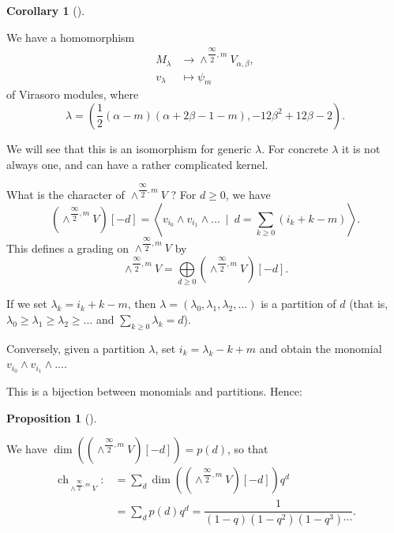 \documentclass
[numbers=enddot,12pt,final,onecolumn,german,notitlepage]{scrartcl}%
\theoremstyle{definition}
\newtheorem{prop}[theo]{Proposition}
\newenvironment{proposition}[1][]
{\begin{prop}[#1]\begin{leftbar}}
{\end{leftbar}\end{prop}}
\newtheorem{coro}[theo]{Corollary}
\newenvironment{corollary}[1][]
{\begin{coro}[#1]\begin{leftbar}}
{\end{leftbar}\end{coro}}
\begin{document}
\begin{corollary}
We have a homomorphism%
\begin{align*}
M_{\lambda}  &  \rightarrow\wedge^{\dfrac{\infty}{2},m}V_{\alpha,\beta},\\
v_{\lambda}  &  \mapsto\psi_{m}%
\end{align*}
of Virasoro modules, where%
\[
\lambda=\left(  \dfrac{1}{2}\left(  \alpha-m\right)  \left(  \alpha
+2\beta-1-m\right)  ,-12\beta^{2}+12\beta-2\right)  .
\]

\end{corollary}

We will see that this is an isomorphism for generic $\lambda$. For concrete
$\lambda$ it is not always one, and can have a rather complicated kernel.

What is the character of $\wedge^{\dfrac{\infty}{2},m}V$ ? For $d\geq0$, we
have%
\[
\left(  \wedge^{\dfrac{\infty}{2},m}V\right)  \left[  -d\right]  =\left\langle
v_{i_{0}}\wedge v_{i_{1}}\wedge...\ \mid\ d=\sum\limits_{k\geq0}\left(
i_{k}+k-m\right)  \right\rangle .
\]
This defines a grading on $\wedge^{\dfrac{\infty}{2},m}V$ by%
\[
\wedge^{\dfrac{\infty}{2},m}V=\bigoplus\limits_{d\geq0}\left(  \wedge
^{\dfrac{\infty}{2},m}V\right)  \left[  -d\right]  .
\]


If we set $\lambda_{k}=i_{k}+k-m$, then $\lambda=\left(  \lambda_{0}%
,\lambda_{1},\lambda_{2},...\right)  $ is a partition of $d$ (that is,
$\lambda_{0}\geq\lambda_{1}\geq\lambda_{2}\geq...$ and $\sum\limits_{k\geq
0}\lambda_{k}=d$).

Conversely, given a partition $\lambda$, set $i_{k}=\lambda_{k}-k+m$ and
obtain the monomial $v_{i_{0}}\wedge v_{i_{1}}\wedge...$.

This is a bijection between monomials and partitions. Hence:

\begin{proposition}
We have $\dim\left(  \left(  \wedge^{\dfrac{\infty}{2},m}V\right)  \left[
-d\right]  \right)  =p\left(  d\right)  $, so that%
\begin{align*}
\operatorname*{ch}\nolimits_{\wedge^{\dfrac{\infty}{2},m}V}:  &  =\sum_{d}%
\dim\left(  \left(  \wedge^{\dfrac{\infty}{2},m}V\right)  \left[  -d\right]
\right)  q^{d}\\
&  =\sum_{d}p\left(  d\right)  q^{d}=\dfrac{1}{\left(  1-q\right)  \left(
1-q^{2}\right)  \left(  1-q^{3}\right)  \cdots}.
\end{align*}

\end{proposition}
\end{document}
